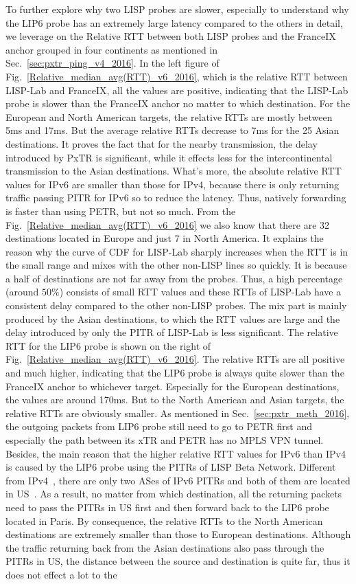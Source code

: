 To further explore why two LISP probes are slower, especially to understand why the LIP6 probe has an extremely large latency compared to the others in detail, we leverage on the Relative RTT between both LISP probes and the FranceIX anchor grouped in four continents as mentioned in Sec.~\ref{sec:pxtr_ping_v4_2016}. In the left figure of Fig.~\ref{Relative_median_avg(RTT)_v6_2016}, which is the relative RTT between LISP-Lab and FranceIX, all the values are positive, indicating that the LISP-Lab probe is slower than the FranceIX anchor no matter to which destination. For the European and North American targets, the relative RTTs are mostly between 5ms and 17ms. But the average relative RTTs decrease to 7ms for the 25 Asian destinations. It proves the fact that for the nearby transmission, the delay introduced by PxTR is significant, while it effects less for the intercontinental transmission to the Asian destinations. What's more, the absolute relative RTT values for IPv6 are smaller than those for IPv4, because there is only returning traffic passing PITR for IPv6 so to reduce the latency. Thus, natively forwarding is faster than using PETR, but not so much. From the Fig.~\ref{Relative_median_avg(RTT)_v6_2016} we also know that there are 32 destinations located in Europe and just 7 in North America. It explains the reason why the curve of CDF for LISP-Lab sharply increases when the RTT is in the small range and mixes with the other non-LISP lines so quickly. It is because a half of destinations are not far away from the probes. Thus, a high percentage (around $50\%$) consists of small RTT values and these RTTs of LISP-Lab have a consistent delay compared to the other non-LISP probes. The mix part is mainly produced by the Asian destinations, to which the RTT values are large and the delay introduced by only the PITR of LISP-Lab is less significant. The relative RTT for the LIP6 probe is shown on the right of Fig.~\ref{Relative_median_avg(RTT)_v6_2016}. The relative RTTs are all positive and much higher, indicating that the LIP6 probe is always quite slower than the FranceIX anchor to whichever target. Especially for the European destinations, the values are around 170ms. But to the North American and Asian targets, the relative RTTs are obviously smaller. As mentioned in Sec.~\ref{sec:pxtr_meth_2016}, the outgoing packets from LIP6 probe still need to go to PETR first and especially the path between its xTR and PETR has no MPLS VPN tunnel. Besides, the main reason that the higher relative RTT values for IPv6 than IPv4 is caused by the LIP6 probe using the PITRs of LISP Beta Network. Different from IPv4~\cite{bgpv4}, there are only two ASes of IPv6 PITRs and both of them are located in US~\cite{bgpv6}. As a result, no matter from which destination, all the returning packets need to pass the PITRs in US first and then forward back to the LIP6 probe located in Paris. By consequence, the relative RTTs to the North American destinations are extremely smaller than those to European destinations. Although the traffic returning back from the Asian destinations also pass through the PITRs in US, the distance between the source and destination is quite far, thus it does not effect a lot to the 